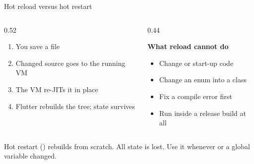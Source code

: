\documentclass[10pt,aspectratio=169,t]{beamer}
\begin{document}
\begin{frame}[fragile,eyebrow=Flutter]{Hot reload versus hot restart}
  \begin{columns}[T]
    \begin{column}{0.52\textwidth}
      \begin{enumerate}
        \item You save a  file
        \item Changed source goes to the running VM
        \item The VM re-JITs it in place
        \item Flutter rebuilds the tree; state survives
      \end{enumerate}
    \end{column}
    \begin{column}{0.44\textwidth}
\begin{panel}
{\bfseries What reload cannot do}
\vskip 1mm
\begin{itemize}
  \item Change  or start-up code
  \item Change an enum into a class
  \item Fix a compile error first
  \item Run inside a release build at all
\end{itemize}
\end{panel}
    \end{column}
  \end{columns}
  \begin{takeaway}{Hot restart () rebuilds from scratch.}
    All state is lost. Use it whenever  or a global variable changed.
  \end{takeaway}
\end{frame}
\end{document}
